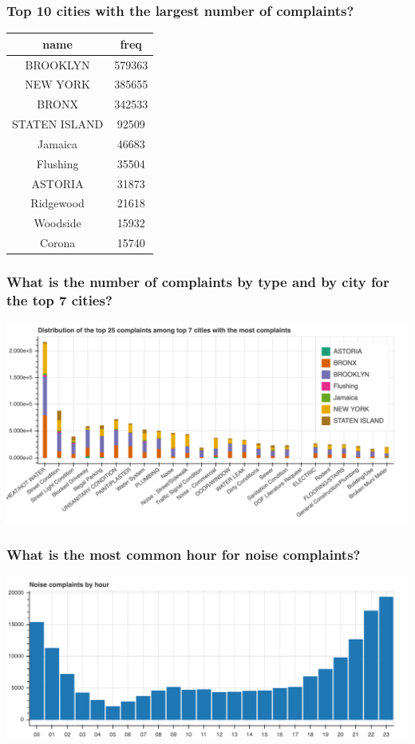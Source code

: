 \documentclass[10pt]{beamer}
\begin{document}
\begin{frame} \frametitle{Top 10 cities with the largest number of complaints?}
\begin{center}
 \begin{tabular}{||c c||}
 \hline
 name & freq \\ [0.5ex]
 \hline\hline
BROOKLYN    & 579363 \\
NEW YORK    & 385655 \\
BRONX   & 342533 \\
STATEN ISLAND   & 92509 \\
Jamaica & 46683 \\
Flushing    & 35504 \\
ASTORIA & 31873 \\
Ridgewood   & 21618 \\
Woodside    & 15932 \\
Corona  & 15740 \\ [1ex]
 \hline
\end{tabular}
\end{center}
\end{frame}


\begin{frame} \frametitle{What is the number of complaints by type and by city for the top 7 cities?}
\includegraphics[scale=0.21]{topcomplaintsfortop7cities}
\end{frame}

\begin{frame} \frametitle{What is the most common hour for noise complaints?}
\includegraphics[scale=0.21]{noisecomplaintsbyhour}
\end{frame}
\end{document}
